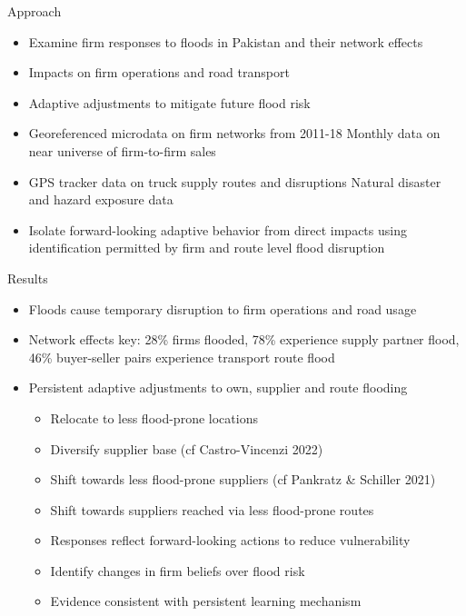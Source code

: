 \documentclass{beamer}
\begin{document}
\begin{frame}{Approach}
    
\begin{itemize}
    \item Examine firm responses to floods in Pakistan and their network effects
    \item Impacts on firm operations and road transport
    \item Adaptive adjustments to mitigate future flood risk
    \item  Georeferenced microdata on firm networks from 2011-18
    Monthly data on near universe of firm-to-firm sales
    \item GPS tracker data on truck supply routes and disruptions
    Natural disaster and hazard exposure data
    \item Isolate forward-looking adaptive behavior from direct impacts using
    identification permitted by firm and route level flood disruption
\end{itemize}
\end{frame}

\begin{frame}{Results}
    \begin{itemize}
        \item Floods cause temporary disruption to firm operations and road usage
        \item Network effects key: 28\% firms flooded, 78\% experience supply partner flood, 46\% buyer-seller pairs experience transport route flood
        \item Persistent adaptive adjustments to own, supplier and route flooding
        \begin{itemize}
        \item Relocate to less flood-prone locations
        \item Diversify supplier base (cf Castro-Vincenzi 2022)
        \item Shift towards less flood-prone suppliers (cf Pankratz \& Schiller 2021)
        \item Shift towards suppliers reached via less flood-prone routes
        \item Responses reflect forward-looking actions to reduce vulnerability
        \item Identify changes in firm beliefs over flood risk
        \item Evidence consistent with persistent learning mechanism
    \end{itemize}
    
    \end{itemize}
    \end{frame}
\end{document}
